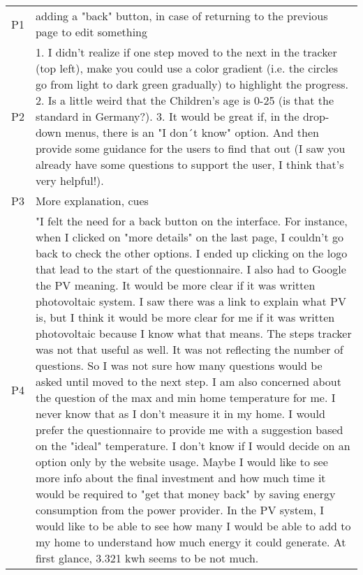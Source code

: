 \begin{center}
  \scriptsize
    \begin{longtable}[h!]{ | p{} | p{} | }
        \hline  
        \rowcolor{lightgray} \multicolumn{2}{|c|}{Q6. What would you change about the website to make it more user-friendly?} \\
        \hline
        P1 & adding a "back" button, in case of returning to the previous page to edit something \\
        \hline
        P2 & 1. I didn't realize if one step moved to the next in the tracker (top left), make you could use a color gradient (i.e. the circles go from light to dark green gradually)  to highlight the progress. 2. Is a little weird that the Children's age is 0-25 (is that the standard in Germany?). 3. It would be great if, in the drop-down menus, there is an "I don´t know" option. And then provide some guidance for the users to find that out (I saw you already have some questions to support the user, I think that's very helpful!). \\
        \hline
        P3 & More explanation, cues \\
        \hline
        P4 & "I felt the need for a back button on the interface. For instance, when I clicked on "more details" on the last page, I couldn't go back to check the other options. I ended up clicking on the logo that lead to the start of the questionnaire.
        I also had to Google the PV meaning. It would be more clear if it was written photovoltaic system. I saw there was a link to explain what PV is, but I think it would be more clear for me if it was written photovoltaic because I know what that means. 
        The steps tracker was not that useful as well. It was not reflecting the number of questions. So I was not sure how many questions would be asked until moved to the next step.
        I am also concerned about the question of the max and min home temperature for me. I never know that as I don't measure it in my home. I would prefer the questionnaire to provide me with a suggestion based on the "ideal" temperature. 
        I don't know if I would decide on an option only by the website usage. Maybe I would like to see more info about the final investment and how much time it would be required to "get that money back" by saving energy consumption from the power provider.
        In the PV system, I would like to be able to see how many I would be able to add to my home to understand how much energy it could generate. At first glance, 3.321 kwh seems to be not much.

\end{longtable}
\end{center}
